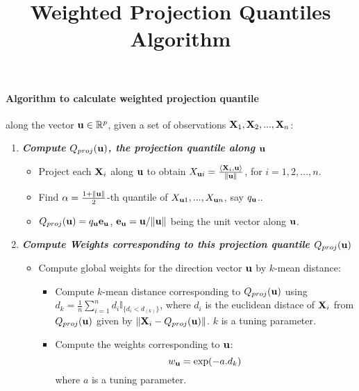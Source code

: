 \documentclass{article}
\title{Weighted Projection Quantiles Algorithm}
\begin{document}
\maketitle

\paragraph{Algorithm to calculate weighted projection quantile} along the vector ${\bf{u}} \in\mathbb{R}^p$, given a set of observations ${\mathbf{X}}_1,{\mathbf{X}}_2,...,{\mathbf{X}}_n$:

\begin{enumerate}

\item \textbf{\textit{Compute $Q_{proj}({\bf{u}})$, the projection quantile along ${\bf{u}}$}}

\begin{itemize}
\item Project each ${\mathbf{X}}_i$ along ${\bf{u}}$ to obtain $X_{{\bf{u}} i}=\frac{\langle{\mathbf{X}}_i,{\bf{u}}\rangle}{\|{\bf{u}}\|}$, for $i=1,2,...,n$.
\item Find $\alpha=\frac{1+\|{\bf{u}}\|}{2}$-th quantile of $X_{{\bf{u}} 1},...,X_{{\bf{u}} n}$, say $q_{\bf{u}}$..
\item $Q_{proj}({\bf{u}})=q_{\bf{u}}{\bf{e}}_{\bf{u}}$, ${\bf{e}}_{\bf{u}}={\bf{u}}/\|{\bf{u}}\|$ being the unit vector along ${\bf{u}}$.

\end{itemize}

\item \textit{\textbf{Compute Weights corresponding to this projection quantile $Q_{proj}({\bf{u}})$}}

\begin{itemize}

\item Compute global weights for the direction vector ${\bf{u}}$ by $k$-mean distance:

\begin{itemize}
\item Compute $k$-mean distance corresponding to $Q_{proj}({\bf{u}})$ using $d_k=\frac{1}{n}\sum_{i=1}^nd_i\mathbb{I}_{\{d_i<d_{(k)}\}}$, where $d_i$ is the euclidean distace of ${\mathbf{X}}_i$ from $Q_{proj}({\bf{u}})$ given by $\|{\mathbf{X}}_i-Q_{proj}({\bf{u}})\|$. $k$ is a tuning parameter.\\

\item Compute the weights corresponding to ${\bf{u}}$:
$$w_{\bf{u}}=\exp(-a.d_k)$$
where $a$ is a tuning parameter. 
\end{itemize}


\end{itemize}
\end{enumerate}
\end{document}
